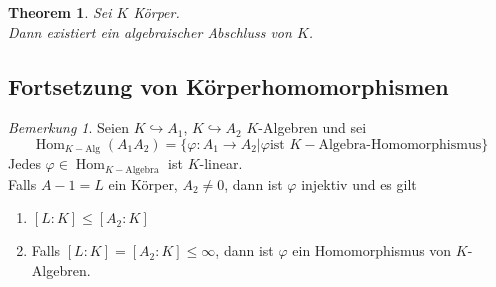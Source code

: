 \documentclass[10pt,a4paper]{article}
\newcommand{\Hom}{\operatorname{Hom}}
\newcounter{thm}[section]
\theoremstyle{definition}
\theoremstyle{plain}
\newtheorem{theorem}[thm]{Theorem}
\theoremstyle{remark}
\newtheorem{bem}[thm]{Bemerkung}
\begin{document}
\begin{theorem}
	Sei $K$ Körper.\\
	Dann existiert ein algebraischer Abschluss von $K$.
\end{theorem}


\subsection{Fortsetzung von Körperhomomorphismen}
\begin{bem}
	Seien $K\hookrightarrow A_1$, $K\hookrightarrow A_2$ $K$-Algebren und sei
	\[\Hom_{K-\text{Alg}}(A_1A_2)=\{\varphi:A_1\rightarrow A_2|\varphi\text{ist $K-$Algebra-Homomorphismus}\}\]
	Jedes $\varphi\in\Hom_{K-\text{Algebra}}$ ist $K$-linear.\\
	Falls $A-1=L$ ein Körper, $A_2\neq 0$, dann ist $\varphi$ injektiv und es gilt
	\begin{enumerate}
		\item $[L:K]\leq[A_2:K]$
		\item Falls $[L:K]=[A_2:K]\leq \infty$, dann ist $\varphi$ ein Homomorphismus von $K$-Algebren.
	\end{enumerate}
\end{bem}
\end{document}
